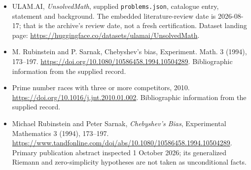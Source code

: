 \documentclass[11pt,a4paper]{article}
\begin{document}
{\small

\begin{itemize}

\item[\hypertarget{source:statement:1}{S1}] ULAM.AI, \emph{UnsolvedMath}, supplied \texttt{problems.json}, catalogue entry, statement and background. The embedded literature-review date is 2026-08-17; that is the archive’s review date, not a fresh certification. Dataset landing page: \url{https://huggingface.co/datasets/ulamai/UnsolvedMath}.

\item[\hypertarget{source:statement:2}{S2}] M. Rubinstein and P. Sarnak, Chebyshev's bias, Experiment. Math. 3 (1994), 173--197. \url{https://doi.org/10.1080/10586458.1994.10504289}. Bibliographic information from the supplied record.

\item[\hypertarget{source:statement:3}{S3}] Prime number races with three or more competitors, 2010. \url{https://doi.org/10.1016/j.jnt.2010.01.002}. Bibliographic information from the supplied record.


\item[E1] Michael Rubinstein and Peter Sarnak, \emph{Chebyshev's Bias},
Experimental Mathematics 3 (1994), 173--197.
\url{https://www.tandfonline.com/doi/abs/10.1080/10586458.1994.10504289}.
Primary publication abstract inspected 1 October 2026; its generalized
Riemann and zero-simplicity hypotheses are not taken as unconditional facts.

\end{itemize}

}

\label{end:statement}
\end{document}
